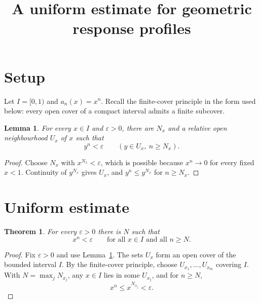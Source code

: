 \documentclass{article}
\title{A uniform estimate for geometric response profiles}
\author{}
\date{}
\newtheorem{lemma}{Lemma}
\newtheorem{theorem}{Theorem}
\begin{document}
\maketitle

\section{Setup}

Let \(I=[0,1)\) and \(a_n(x)=x^n\). Recall the finite-cover principle in
the form used below: every open cover of a compact interval admits a finite
subcover.

\begin{lemma}\label{lem:pointwise-neighbourhood}
For every \(x\in I\) and \(\varepsilon>0\), there are \(N_x\) and a
relative open neighbourhood \(U_x\) of \(x\) such that
\[
 y^n<\varepsilon \qquad(y\in U_x,\ n\geq N_x).
\]
\end{lemma}

\begin{proof}
Choose \(N_x\) with \(x^{N_x}<\varepsilon\), which is possible because
\(x^n\to0\) for every fixed \(x<1\). Continuity of \(y^{N_x}\) gives
\(U_x\), and \(y^n\leq y^{N_x}\) for \(n\geq N_x\).
\end{proof}

\section{Uniform estimate}

\begin{theorem}\label{thm:uniform-decay}
For every \(\varepsilon>0\) there is \(N\) such that
\[
 x^n<\varepsilon
 \qquad\text{for all }x\in I\text{ and all }n\geq N.
\]
\end{theorem}

\begin{proof}
Fix \(\varepsilon>0\) and use Lemma~\ref{lem:pointwise-neighbourhood}.
The sets \(U_x\) form an open cover of the bounded interval \(I\).
By the finite-cover principle, choose
\(U_{x_1},\ldots,U_{x_m}\) covering \(I\). With
\(N=\max_j N_{x_j}\), any \(x\in I\) lies in some \(U_{x_j}\), and for
\(n\geq N\),
\[
 x^n\leq x^{N_{x_j}}<\varepsilon.
\]
\end{proof}
\end{document}

